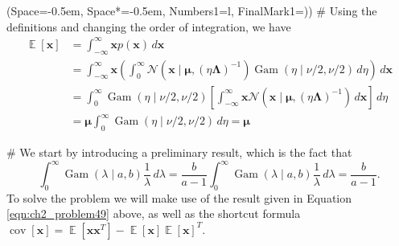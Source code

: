 \documentclass[12pt, a4paper]{article}
\newcommand{\listSpace}{-0.5em}%
\newcommand{\vect}[1]{\bm{#1}}
\DeclareMathOperator{\E}{\mathbb{E}}
\DeclareMathOperator{\cov}{\operatorname{cov}}
\begin{document}
\begin{easylist}[enumerate]
	\ListProperties(Space=\listSpace, Space*=\listSpace, Numbers1=l, FinalMark1={)})
	# Using the definitions and changing the order of integration, we have
	\begin{align*}
		\E[\vect{x} ] &= \int_{-\infty}^{\infty} \vect{x}  p(\vect{x} ) \, d\vect{x}  \\
		&= \int_{-\infty}^{\infty} \vect{x} 
		\left( 
		\int_{0}^{\infty}
		\mathcal{N}\left(\vect{x} \mid \vect{\mu},  (\eta \vect{\Lambda})^{-1}\right)
		\operatorname{Gam}\left(\eta \mid \nu /2, \nu / 2\right )
		\, d \eta
		 \right) \, d\vect{x} \\
		&= 
		\int_{0}^{\infty}
		\operatorname{Gam}\left(\eta \mid \nu /2, \nu / 2\right )
		\left[ \int_{-\infty}^{\infty} \vect{x}
		\mathcal{N}\left(\vect{x} \mid \vect{\mu},  (\eta \vect{\Lambda})^{-1}\right)
		\, d\vect{x} \right] \, d \eta \\
		&= \vect{\mu}  \int_{0}^{\infty}
		\operatorname{Gam}\left(\eta \mid \nu /2, \nu / 2\right )
		 \, d \eta = \vect{\mu}
	\end{align*}
	
	# We start by introducing a preliminary result, which is the fact that
	\begin{equation}
	\label{eqn:ch2_problem49}
		\int_{0}^{\infty} \operatorname{Gam}(\lambda \mid a, b) \frac{1}{\lambda} \, d \lambda = \frac{b}{a - 1} \int_{0}^{\infty} \operatorname{Gam}(\lambda \mid a, b) \frac{1}{\lambda} \, d \lambda = \frac{b}{a - 1}.
	\end{equation}
	To solve the problem we will make use of the result given in Equation \eqref{eqn:ch2_problem49} above, as well as the shortcut formula $\cov\left[\vect{x}\right] = \E \left[ \vect{x} \vect{x}^T \right]
	-
	\E \left[ \vect{x}  \right] \E \left[ \vect{x}  \right]^T$.
	

\end{easylist}
\end{document}
